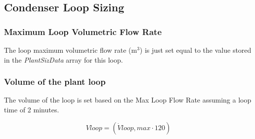 \subsection{Condenser Loop Sizing}\label{condenser-loop-sizing}

\subsubsection{Maximum Loop Volumetric Flow Rate}\label{maximum-loop-volumetric-flow-rate-1}

The loop maximum volumetric flow rate (m\(^{3}\)) is just set equal to the value stored in the \emph{PlantSizData} array for this loop.

\subsubsection{Volume of the plant loop}\label{volume-of-the-plant-loop-1}

The volume of the loop is set based on the Max Loop Flow Rate assuming a loop time of 2 minutes.

\begin{equation}
Vloop = (\dot Vloop,max\cdot 120)
\end{equation}
